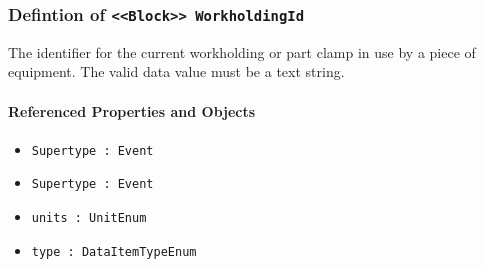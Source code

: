 \subsubsection{Defintion of \texttt{<<Block>> WorkholdingId}}
  \label{type:WorkholdingId}

\FloatBarrier

The identifier for the current workholding or part clamp in use by a piece of equipment. 
 The valid data value must be a text string.

\FloatBarrier
\paragraph{Referenced Properties and Objects}

\begin{itemize}
\item \texttt{Supertype : Event}

\item \texttt{Supertype : Event}

\item \texttt{units : UnitEnum}

\item \texttt{type : DataItemTypeEnum}

\end{itemize}
\FloatBarrier
